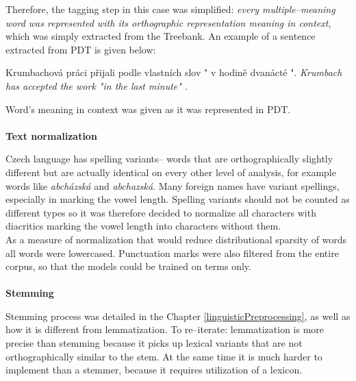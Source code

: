 Therefore, the tagging step in this case was simplified: \textit{every multiple--meaning word was 
represented with its orthographic representation meaning in context}, which was simply extracted from 
the Treebank. An example of a sentence extracted from PDT is given below:
\begin{examples}
\item Krumbachov\'a pr\'aci p\v{r}ijali podle vlastn\'ich slov " v hodin\v{e} dvan\'act\'e ".
\glt \textit{ Krumbach has accepted the work "in the last minute" .} 
\end{examples}
Word's meaning in context was given as it was represented in PDT.
\\\\  \textbf{Text normalization}

Czech language has spelling variants-- words that are orthographically slightly different but are actually 
identical on every other level of analysis, for example words like \textit{abch\'azsk\'a}  and 
\textit{abchazsk\'a}. Many foreign names have variant spellings, especially in marking the vowel length. 
Spelling variants should not be counted as different types so it was therefore decided to normalize all 
characters with diacritics marking the vowel length into characters without them. 
\\As a measure of normalization that would reduce distributional sparsity of words all words were 
lowercased. Punctuation marks were also filtered from the entire corpus, so that the models could be 
trained on terms only. 
\\\\  \textbf{Stemming}

Stemming process was detailed in the Chapter \ref{linguisticPreprocessing}, as well as how it is different 
from lemmatization. To re--iterate: lemmatization is more precise than stemming because it picks up 
lexical variants that are not orthographically similar to the stem. At the same time it is much harder to 
implement than a stemmer, because it requires utilization of a lexicon. 

